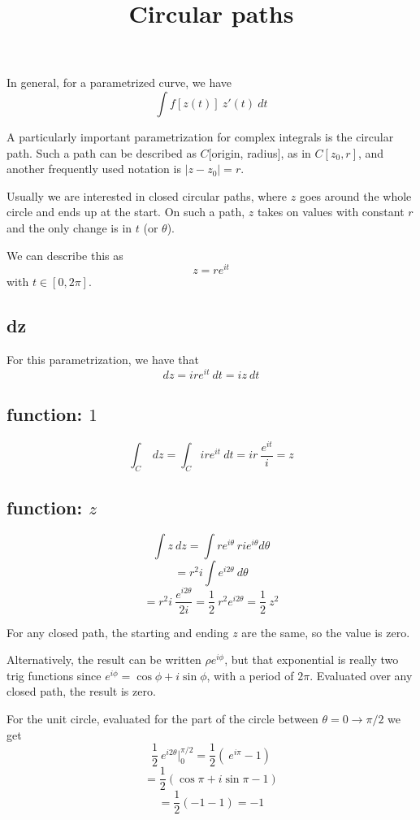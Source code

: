\documentclass[11pt, oneside]{article}
\title{Circular paths}
\date{}
\begin{document}
\maketitle
\Large


In general, for a parametrized curve, we have
\[ \int f[z(t)] \ z'(t) \ dt \]

A particularly important parametrization for complex integrals is the circular path.  Such a path can be described as $C[$origin, radius$]$, as in $C[z_0,r]$, and another frequently used notation is $|z - z_0| = r$.

Usually we are interested in closed circular paths, where $z$ goes around the whole circle and ends up at the start.  On such a path, $z$ takes on values with constant $r$ and the only change is in $t$ (or $\theta$).

We can describe  this as 
\[ z = re^{it} \]
with $t \in [0, 2 \pi]$.

\subsection*{dz}
For this parametrization, we have that
\[ dz = ir e^{it} \ dt = i z \ dt  \]

\subsection*{function:  $1$}
\[ \int_C \ dz = \int_C ir e^{it} \ dt = ir \ \frac{e^{it}}{i} = z \]

\subsection*{function:  $z$}

\[ \int z \ dz = \int re^{i \theta} \ r i e^{i \theta} d \theta \]
\[ = r^2 i \int e^{i 2\theta}  \ d \theta \]
\[ = r^2 i \ \frac{e^{i 2 \theta}}{2i} = \frac{1}{2} \ r^2 e^{i 2 \theta} = \frac{1}{2} \ z^2 \]

For any closed path, the starting and ending $z$ are the same, so the value is zero.  

Alternatively, the result can be written $\rho e^{i \phi}$, but that exponential is really two trig functions since $e^{i \phi} = \cos \phi + i \sin \phi$, with a period of $2 \pi$.  Evaluated over any closed path, the result is zero.

For the unit circle, evaluated for the part of the circle between $\theta = 0 \rightarrow \pi/2$ we get
\[ \frac{1}{2} \ e^{i 2 \theta} \big |_0^{\pi/2} = \frac{1}{2} ( \ e^{i \pi} - 1) \]
\[ = \frac{1}{2} (\cos \pi + i \sin \pi - 1) \]
\[ = \frac{1}{2} (-1 - 1) = - 1 \]
\end{document}
